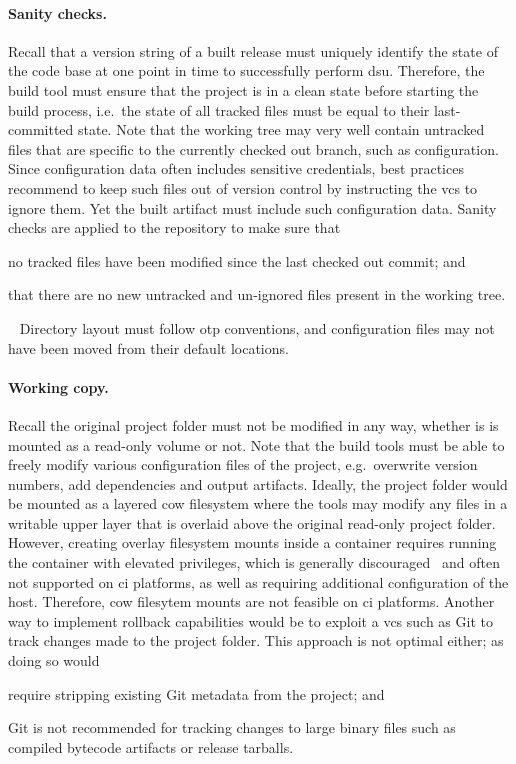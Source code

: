 \paragraph{Sanity checks.} Recall that a version string of a built release must uniquely identify the state of the code base at one point in time to successfully perform \acrshort{dsu}. Therefore, the build tool must ensure that the project is in a clean state before starting the build process, i.e.~the state of all tracked files must be equal to their last-committed state. Note that the working tree may very well contain untracked files that are specific to the currently checked out branch, such as configuration. Since configuration data often includes sensitive credentials, best practices recommend to keep such files out of version control by instructing the \acrshort{vcs} to ignore them. Yet the built artifact must include such configuration data. Sanity checks are applied to the repository to make sure that \begin{enumerate*}[label=(\roman*)]
  \item no tracked files have been modified since the last checked out commit; and
  \item that there are no new untracked and un-ignored files present in the working tree.
\end{enumerate*}~\cite{man:git}
Directory layout must follow \acrshort{otp} conventions, and configuration files may not have been moved from their default locations.

\paragraph{Working copy.} Recall the original project folder must not be modified in any way, whether is is mounted as a read-only volume or not. Note that the build tools must be able to freely modify various configuration files of the project, e.g.~overwrite version numbers, add dependencies and output artifacts.
Ideally, the project folder would be mounted as a layered \acrfull{cow} filesystem where the tools may modify any files in a writable upper layer that is overlaid above the original read-only project folder. However, creating overlay filesystem mounts inside a container requires running the container with elevated privileges, which is generally discouraged~\cite{docker:docs} and often not supported on \acrshort{ci} platforms, as well as requiring additional configuration of the host. Therefore, \acrshort{cow} filesytem mounts are not feasible on \acrshort{ci} platforms. Another way to implement rollback capabilities would be to exploit a \acrlong{vcs} such as Git to track changes made to the project folder. This approach is not optimal either; as doing so would \begin{enumerate*}[label=(\roman*)]
  \item require stripping existing Git metadata from the project; and
  \item Git is not recommended for tracking changes to large binary files such as compiled bytecode artifacts or release tarballs.
\end{enumerate*}

